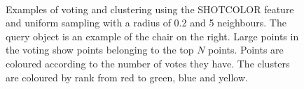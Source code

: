 \documentclass[11pt,a4paper]{kth-mag}
\begin{document}
\begin{figure}
  \centering
  \\
  \caption{Examples of voting and clustering using the SHOTCOLOR feature and
    uniform sampling with a radius of 0.2 and 5 neighbours. The query object is
    an example of the chair on the right. Large points in the voting show points
    belonging to the top $N$ points. Points are coloured according to the number
    of votes they have. The clusters are coloured by rank from red to green,
    blue and yellow.}
  \label{fig:clusters_ex}
\end{figure}
\end{document}
